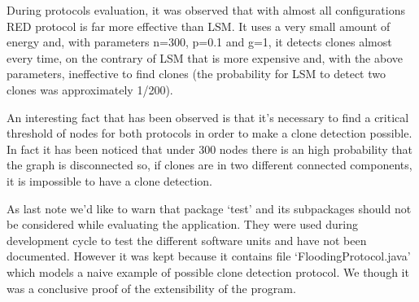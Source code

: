 During protocols evaluation, it was observed that with almost all 
configurations RED protocol is far more effective than LSM. 
It uses a very small amount of energy and, with parameters n=300, p=0.1 and 
g=1, it detects clones almost every time, on the contrary of LSM that is more
expensive and, with the above parameters, ineffective to find clones 
(the probability for LSM to detect two clones was approximately 1/200).

An interesting fact that has been observed is that it's necessary to find a 
critical threshold of nodes for both protocols in order to make a clone 
detection possible. 
In fact it has been noticed that under 300 nodes there is an high probability 
that the graph is disconnected so, if clones are in two different connected
components, it is impossible to have a clone detection.

As last note we'd like to warn that package `test' and its subpackages should
not be considered while evaluating the application. They were used during 
development cycle to test the different software units and have not been 
documented. However it was kept because it contains file 
`FloodingProtocol.java' which models a naive example of possible clone
detection protocol. We though it was a conclusive proof of the extensibility 
of the program.